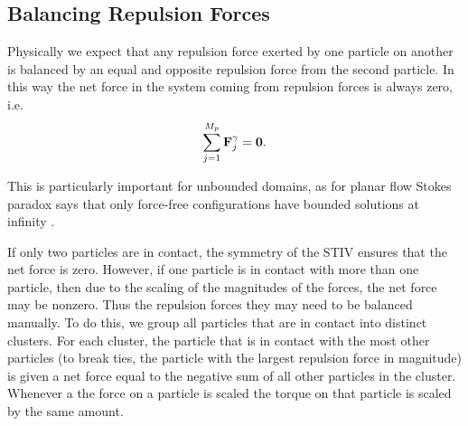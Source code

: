 \documentclass[preprint, 10pt]{elsarticle}
\begin{document}
\subsection{Balancing Repulsion Forces}

Physically we expect that any repulsion force exerted by one particle on another is balanced by an equal and opposite repulsion force from the second particle. In this way the net force in the system coming from repulsion forces is always zero, i.e. 
\begin{equation*}
	\sum\limits_{j=1}^{M_p} {\mathbf{F}}^\gamma_j = \mathbf{0}.
\end{equation*}

This is particularly important for unbounded domains, as for planar flow Stokes paradox says that only force-free configurations have bounded solutions at infinity \cite{Power1993, Pozrikidis1992}. 

If only two particles are in contact, the symmetry of the STIV ensures that the net force is zero. However, if one particle is in contact with more than one particle, then due to the scaling of the magnitudes of the forces, the net force may be nonzero. Thus the repulsion forces they may need to be balanced manually. To do this, we group all particles that are in contact into distinct clusters. For each cluster, the particle that is in contact with the most other particles (to break ties, the particle with the largest repulsion force in magnitude) is given a net force equal to the negative sum of all other particles in the cluster. Whenever a the force on a particle is scaled the torque on that particle is scaled by the same amount. 
\end{document}
